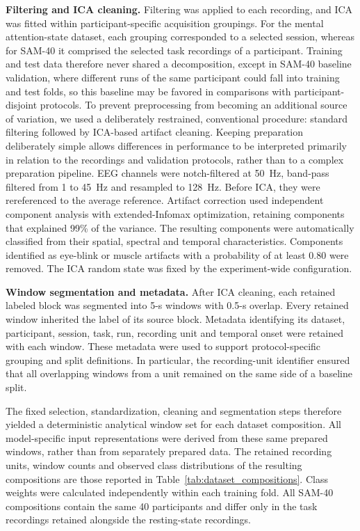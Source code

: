 \documentclass[10pt,letterpaper]{article}
\newcommand{\rev}[1]{#1}
\begin{document}
\rev{\textbf{Filtering and ICA cleaning.} Filtering was applied to each
recording, and ICA was fitted within participant-specific acquisition
groupings. For the mental attention-state dataset, each grouping corresponded
to a selected session, whereas for SAM-40 it comprised the selected task recordings
of a participant. Training and test data therefore
never shared a decomposition, except in SAM-40 baseline validation, where
different runs of the same participant could fall into training and test folds,
so this baseline may be favored in comparisons with participant-disjoint protocols. To prevent preprocessing from becoming an additional source
of variation, we used a deliberately restrained, conventional procedure:
standard filtering followed by ICA-based artifact cleaning. Keeping
preparation deliberately simple allows differences in performance to be
interpreted primarily in relation to the recordings and validation protocols,
rather than to a complex preparation pipeline. EEG channels were notch-filtered
at 50~Hz, band-pass filtered from 1 to 45~Hz and resampled to 128~Hz. Before
ICA, they were rereferenced to the average reference. Artifact correction used independent component analysis with
extended-Infomax optimization, retaining components that explained 99\% of the
variance. The resulting components were automatically classified from their
spatial, spectral and temporal characteristics. Components identified as
eye-blink or muscle artifacts with a probability of at least 0.80 were removed.
The ICA random state was fixed by the experiment-wide configuration.}

\rev{\textbf{Window segmentation and metadata.} After ICA cleaning, each
retained labeled block was segmented into 5-s windows with 0.5-s overlap.
Every retained window inherited the label of its source block. Metadata
identifying its dataset, participant, session, task, run, recording unit and
temporal onset were retained with each window. These metadata were used to
support protocol-specific grouping and split definitions. In particular, the
recording-unit identifier ensured that all overlapping windows from a unit
remained on the same side of a baseline split.}

\rev{The fixed selection, standardization, cleaning and segmentation steps therefore
yielded a deterministic analytical window set for each dataset composition.
All model-specific input representations were derived from these same prepared
windows, rather than from separately prepared data. The retained recording
units, window counts and observed class distributions of the resulting
compositions are those reported in Table~\ref{tab:dataset_compositions}. Class weights were calculated
independently within each training fold. All SAM-40 compositions contain the same 40 participants and
differ only in the task recordings retained alongside the resting-state
recordings.}
\end{document}
